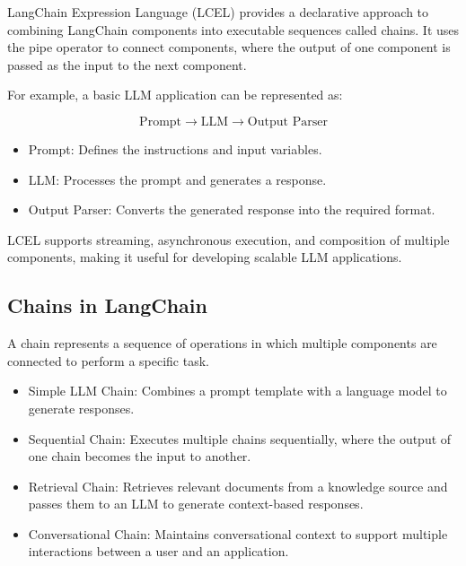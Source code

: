 LangChain Expression Language (LCEL) provides a declarative approach to combining LangChain components into executable sequences called chains. It uses the pipe operator to connect components, where the output of one component is passed as the input to the next component.

For example, a basic LLM application can be represented as:

\[
\text{Prompt} \rightarrow \text{LLM} \rightarrow \text{Output Parser}
\]

\begin{itemize}
    \item Prompt: Defines the instructions and input variables.
    
    \item LLM: Processes the prompt and generates a response.
    
    \item Output Parser: Converts the generated response into the required format.
\end{itemize}

LCEL supports streaming, asynchronous execution, and composition of multiple components, making it useful for developing scalable LLM applications.

\subsection{Chains in LangChain}

A chain represents a sequence of operations in which multiple components are connected to perform a specific task.

\begin{itemize}
    \item Simple LLM Chain: Combines a prompt template with a language model to generate responses.
    
    \item Sequential Chain: Executes multiple chains sequentially, where the output of one chain becomes the input to another.
    
    \item Retrieval Chain: Retrieves relevant documents from a knowledge source and passes them to an LLM to generate context-based responses.
    
    \item Conversational Chain: Maintains conversational context to support multiple interactions between a user and an application.
\end{itemize}

